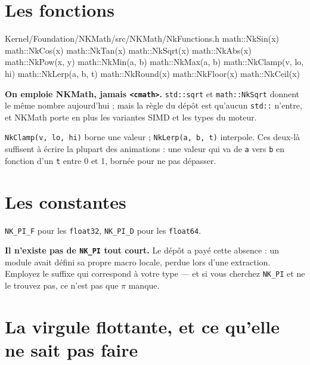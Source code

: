 \section{Les fonctions}

\begin{nkcode}{Kernel/Foundation/NKMath/src/NKMath/NkFunctions.h}
math::NkSin(x)      math::NkCos(x)      math::NkTan(x)
math::NkSqrt(x)     math::NkAbs(x)      math::NkPow(x, y)
math::NkMin(a, b)   math::NkMax(a, b)   math::NkClamp(v, lo, hi)
math::NkLerp(a, b, t)
math::NkRound(x)    math::NkFloor(x)    math::NkCeil(x)
\end{nkcode}

\begin{nkpiege}
\textbf{On emploie NKMath, jamais \texttt{<cmath>}.} \texttt{std::sqrt} et
\texttt{math::NkSqrt} donnent le même nombre aujourd'hui ; mais la règle du dépôt
est qu'aucun \texttt{std::} n'entre, et NKMath porte en plus les variantes SIMD
et les types du moteur.
\end{nkpiege}

\begin{nkretenir}
\texttt{NkClamp(v, lo, hi)} borne une valeur ; \texttt{NkLerp(a, b, t)}
interpole. Ces deux-là suffisent à écrire la plupart des animations : une valeur
qui va de \texttt{a} vers \texttt{b} en fonction d'un \texttt{t} entre 0 et 1,
bornée pour ne pas dépasser.
\end{nkretenir}

\section{Les constantes}

\texttt{NK\_PI\_F} pour les \texttt{float32}, \texttt{NK\_PI\_D} pour les
\texttt{float64}.

\begin{nkpiege}
\textbf{Il n'existe pas de \texttt{NK\_PI} tout court.} Le dépôt a payé cette
absence : un module avait défini sa propre macro locale, perdue lors d'une
extraction. Employez le suffixe qui correspond à votre type --- et si vous
cherchez \texttt{NK\_PI} et ne le trouvez pas, ce n'est pas que $\pi$ manque.
\end{nkpiege}

\section{La virgule flottante, et ce qu'elle ne sait pas faire}

